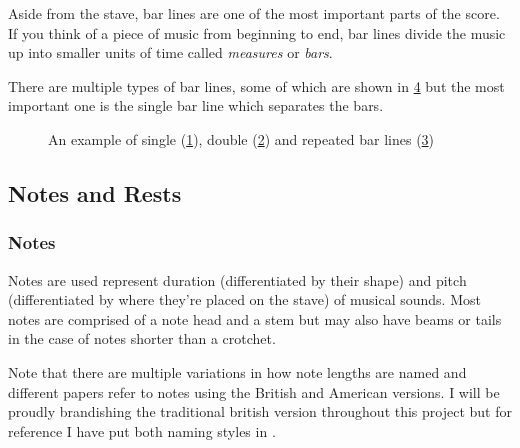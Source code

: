 Aside from the stave, bar lines are one of the most important parts of the score. If you think of a piece of music from beginning to end, bar lines divide the music up into smaller units of time called \emph{measures} or \emph{bars}.

There are multiple types of bar lines, some of which are shown in \cref{fig:bar-line-types} but the most important one is the single bar line which separates the bars.

\begin{figure}[H]
  \centering

  \begin{subfigure}[b]{.3\linewidth}
      \centering
      \label{fig:single-bar-line}
  \end{subfigure}
  \begin{subfigure}[b]{.3\linewidth}
      \centering
      \label{fig:double-bar-line}
  \end{subfigure}
  \begin{subfigure}[b]{.3\linewidth}
      \centering
      \label{fig:repeat-bar-line}
  \end{subfigure}

  \caption{An example of single (\cref{fig:single-bar-line}), double (\cref{fig:double-bar-line}) and repeated bar lines (\cref{fig:repeat-bar-line})}
  \label{fig:bar-line-types}
\end{figure}

\subsection{Notes and Rests}

\subsubsection{Notes}
\label{sec:music-theory-notes}
Notes are used represent duration (differentiated by their shape) and pitch (differentiated by where they're placed on the stave) of musical sounds. Most notes are comprised of a note head and a stem but may also have beams or tails in the case of notes shorter than a crotchet.

Note that there are multiple variations in how note lengths are named and different papers refer to notes using the British and American versions. I will be proudly brandishing the traditional british version throughout this project but for reference I have put both naming styles in .

